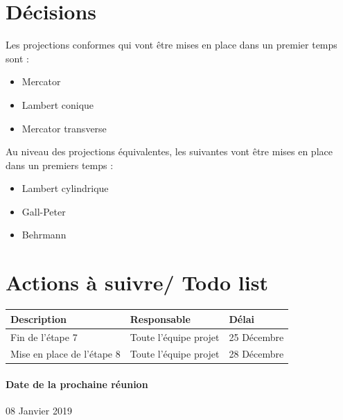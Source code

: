 \documentclass{article}
\begin{document}
\section{Décisions}
Les projections conformes qui vont être mises en place dans un premier temps sont : 
\begin{itemize}
  \item Mercator 
  \item Lambert conique 
  \item Mercator transverse 
\end{itemize}

Au niveau des projections équivalentes, les suivantes vont être mises en place dans un premiers temps :
\begin{itemize}
  \item Lambert cylindrique 
  \item Gall-Peter
  \item Behrmann 
\end{itemize}

\section{Actions à suivre/ Todo list}

\begin{tabular}{|C{5cm}|C{3cm}|C{3cm}|}
\hline {} Description & Responsable & Délai \\
\hline  Fin de l'étape 7 & Toute l'équipe projet  & 25 Décembre  \\
\hline 
Mise en place de l'étape 8 & Toute l'équipe projet  & 28 Décembre \\
\hline
\end{tabular}

\paragraph{Date de la prochaine réunion}
08 Janvier 2019
\end{document}

